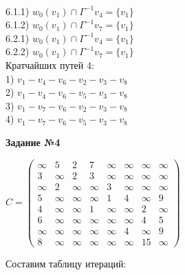 \documentclass{article}
\begin{document}
\\
\hspace*{12mm} 6.1.1) $w_0(v_1) \cap \Gamma^{-1} v_4 = \{v_1\}$
\\
\hspace*{12mm} 6.1.2) $w_0(v_1) \cap \Gamma^{-1} v_7 = \{v_1\}$
\\
\hspace*{12mm} 6.2.1) $w_0(v_1) \cap \Gamma^{-1} v_4 = \{v_1\}$
\\
\hspace*{12mm} 6.2.2) $w_0(v_1) \cap \Gamma^{-1} v_7 = \{v_1\}$
\\
\newpage
\noindent
\hspace*{8mm} Кратчайших путей 4:
\\
\hspace*{12mm} 1) $v_1 - v_4 - v_6 - v_2 - v_3 - v_8$
\\
\hspace*{12mm} 2) $v_1 - v_4 - v_6 - v_5 - v_3 - v_8$
\\
\hspace*{12mm} 3) $v_1 - v_7 - v_6 - v_2 - v_3 - v_8$
\\
\hspace*{12mm} 4) $v_1 - v_7 - v_6 - v_5 - v_3 - v_8$
\newpage
\begin{center}
	\textbf{Задание №4}
\end{center}
\hspace{10mm}$C = 
\begin{pmatrix}
	\infty & 5 & 2 & 7 & \infty & \infty & \infty & \infty \\
	3 & \infty & 2 & 3 & \infty  & \infty & \infty & \infty \\
	\infty & 2 & \infty & \infty & 3 & \infty & \infty & \infty \\
	5 & \infty & \infty & \infty & 1 & 4 & \infty & 9 \\
	4 & \infty & \infty & 1 & \infty & \infty & 2 & \infty \\
	6 & \infty & \infty & \infty & \infty & \infty & 4 & 5 \\
	\infty & \infty & \infty & \infty & \infty & 4 & \infty & 9 \\
    8 & \infty & \infty & \infty & \infty & \infty & 15 & \infty
\end{pmatrix}$
\vspace{5mm}
\par
\hspace{2mm}
Составим таблицу итераций:
\end{document}
